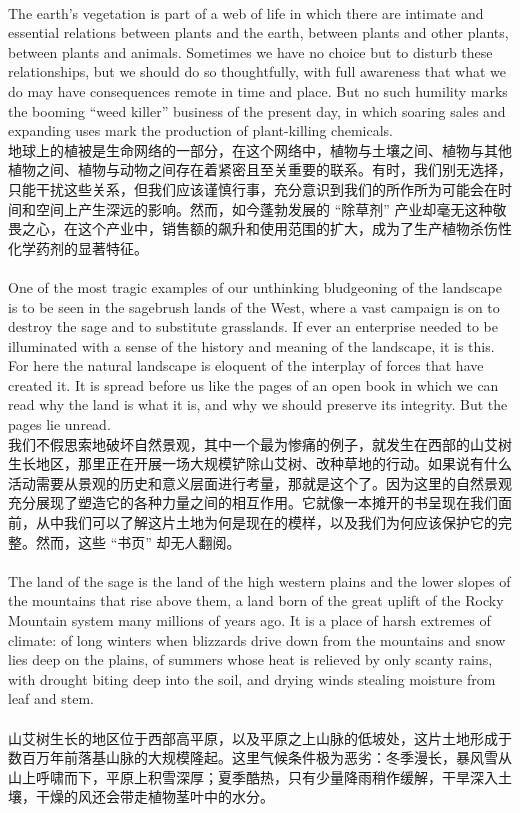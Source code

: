 \documentclass{article}
\begin{document}
\\
The earth’s vegetation is part of a web of life in which there are intimate and essential relations between plants and the earth, between plants and other plants, between plants and animals. Sometimes we have no choice but to disturb these relationships, but we should do so thoughtfully, with full awareness that what we do may have consequences remote in time and place. But no such humility marks the booming “weed killer” business of the present day, in which soaring sales and expanding uses mark the production of plant-killing chemicals.\\
地球上的植被是生命网络的一部分，在这个网络中，植物与土壤之间、植物与其他植物之间、植物与动物之间存在着紧密且至关重要的联系。有时，我们别无选择，只能干扰这些关系，但我们应该谨慎行事，充分意识到我们的所作所为可能会在时间和空间上产生深远的影响。然而，如今蓬勃发展的 “除草剂” 产业却毫无这种敬畏之心，在这个产业中，销售额的飙升和使用范围的扩大，成为了生产植物杀伤性化学药剂的显著特征。 \\

\\
One of the most tragic examples of our unthinking bludgeoning of the landscape is to be seen in the sagebrush lands of the West, where a vast campaign is on to destroy the sage and to substitute grasslands. If ever an enterprise needed to be illuminated with a sense of the history and meaning of the landscape, it is this. For here the natural landscape is eloquent of the interplay of forces that have created it. It is spread before us like the pages of an open book in which we can read why the land is what it is, and why we should preserve its integrity. But the pages lie unread.\\
我们不假思索地破坏自然景观，其中一个最为惨痛的例子，就发生在西部的山艾树生长地区，那里正在开展一场大规模铲除山艾树、改种草地的行动。如果说有什么活动需要从景观的历史和意义层面进行考量，那就是这个了。因为这里的自然景观充分展现了塑造它的各种力量之间的相互作用。它就像一本摊开的书呈现在我们面前，从中我们可以了解这片土地为何是现在的模样，以及我们为何应该保护它的完整。然而，这些 “书页” 却无人翻阅。 \\

\\
The land of the sage is the land of the high western plains and the lower slopes of the mountains that rise above them, a land born of the great uplift of the Rocky Mountain system many millions of years ago. It is a place of harsh extremes of climate: of long winters when blizzards drive down from the mountains and snow lies deep on the plains, of summers whose heat is relieved by only scanty rains, with drought biting deep into the soil, and drying winds stealing moisture from leaf and stem.\\\\
山艾树生长的地区位于西部高平原，以及平原之上山脉的低坡处，这片土地形成于数百万年前落基山脉的大规模隆起。这里气候条件极为恶劣：冬季漫长，暴风雪从山上呼啸而下，平原上积雪深厚；夏季酷热，只有少量降雨稍作缓解，干旱深入土壤，干燥的风还会带走植物茎叶中的水分。 \\\\
\end{document}
